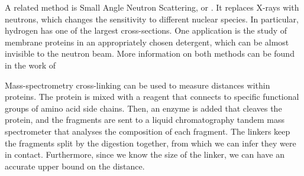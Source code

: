 A related method is Small Angle Neutron Scattering, or \SANS. \marginpar{\SANS}
It replaces X-rays with neutrons, which changes the sensitivity to different nuclear species.
In particular, hydrogen has one of the largest cross-sections.
One application is the study of membrane proteins in an appropriately chosen detergent, which can be almost invisible to the neutron beam.
More information on both methods can be found in the work of~\citet{sax}

Mass-spectrometry cross-linking \citep{cross_linking}  can be used to measure distances within proteins.
The protein is mixed with a reagent that connects to specific functional groups of amino acid side chains.
Then, an enzyme is added that cleaves the protein, and the fragments are sent to a liquid chromatography tandem mass spectrometer that analyses the composition of each fragment.
The linkers keep the fragments split by the digestion together, from which we can infer they were in contact.
Furthermore, since we know the size of the linker, we can have an accurate upper bound on the distance.

